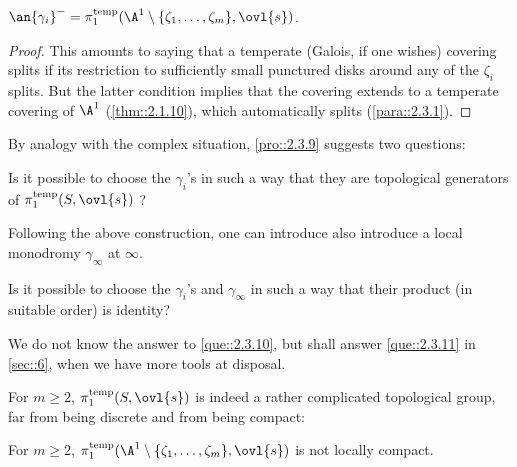 \begin{pro}\label{pro::2.3.9}
 $\an{\gamma_i}^-=
 \pi_1^{\mathrm{temp}}(\A^1\setminus\{\zeta_1,\ldots, \zeta_m\},\ovl{s})$.
\end{pro}

\begin{proof}
 This amounts to saying that a temperate (Galois, if one wishes)
 covering splits if its restriction to sufficiently small punctured disks
 around any of the $\zeta_i$ splits. But the latter condition implies
 that the covering extends to a temperate covering of $\A^1$ 
 (\cf \ref{thm::2.1.10}), which automatically splits (\cf \ref{para::2.3.1}).
\end{proof}

\medskip By analogy with the complex situation, \ref{pro::2.3.9}
suggests two questions:

\begin{que}\label{que::2.3.10} Is it possible to choose the $\gamma_i$'s
 in such a way that they are topological generators of
 $\pi_1^{\mathrm{temp}}(S,\ovl{s})$ ? 
\end{que}

Following the above construction, one can introduce also introduce a
local monodromy $\gamma_\infty$ at $\infty$. 

\begin{que}\label{que::2.3.11} Is it possible to choose the $\gamma_i$'s
 and $\gamma_\infty$ in such a way that their product (in suitable
 order) is identity?
\end{que}

We do not know the answer to \ref{que::2.3.10}, but shall answer 
\ref{que::2.3.11} in \ref{sec::6}, when we have more tools at disposal.

For $m\geq 2$, $\pi_1^{\mathrm{temp}}(S,\ovl{s})$ is indeed a rather
complicated topological group, far from being discrete and from being compact:

\begin{pro}\label{pro::2.3.12} For $m\geq 2$,
 $\pi_1^{\mathrm{temp}}(\A^1\setminus\{\zeta_1,\ldots,
 \zeta_m\},\ovl{s}) $ is not locally compact.
\end{pro}

